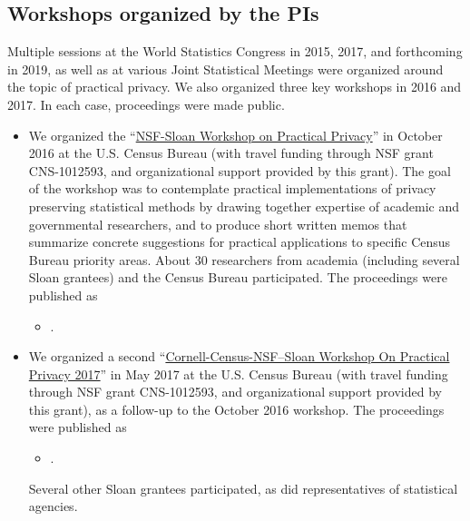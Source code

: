 \documentclass[12pt]{article}
\begin{document}
\subsection{Workshops organized by the PIs}
Multiple sessions at the World Statistics Congress in 2015, 2017, and forthcoming in 2019, as well as at various Joint Statistical Meetings were organized around the topic of practical privacy.
We also organized three key workshops in 2016 and 2017. In each case, proceedings were made public.
\begin{itemize}

\item We organized the ``\href{https://www.ncrn.cornell.edu/event/nsf-sloan-workshop-on-practical-privacy/?instance_id=104204}{NSF-Sloan Workshop on Practical Privacy}'' in October 2016 at the U.S. Census Bureau (with travel funding through NSF grant CNS-1012593, and organizational support provided by this grant). The goal of the workshop was to contemplate practical implementations of privacy preserving statistical methods by drawing together expertise of academic and governmental researchers, and to produce short written memos that summarize concrete suggestions for practical applications to specific Census Bureau priority areas. About 30 researchers from academia (including several Sloan grantees) and the Census Bureau participated. The proceedings were published as
\begin{itemize}
	\item[] .
\end{itemize}

\item We organized a second ``\href{https://www.ncrn.cornell.edu/event/nsf-sloan-workshop-on-practical-privacy-2017/?instance_id=104207}{Cornell-Census-NSF–Sloan Workshop On Practical Privacy 2017}'' in May 2017 at the U.S. Census Bureau (with travel funding through NSF grant CNS-1012593, and organizational support provided by this grant), as a follow-up to the October 2016 workshop. The proceedings were published as \begin{itemize}
	\item[] .
\end{itemize} Several other Sloan grantees participated, as did representatives of statistical agencies.


\end{itemize}
\end{document}
